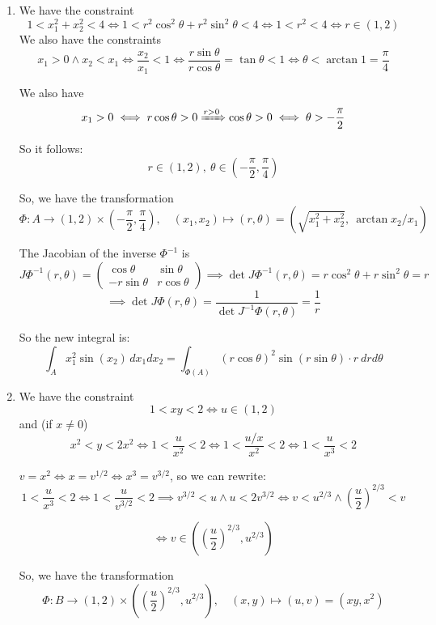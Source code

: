 \documentclass[12pt]{article}
\begin{document}
\begin{enumerate}
    \item We have the constraint 
    $$
        1 < x_1^2 + x_2^2 < 4 \iff 1 < r^2 \cos^2 \theta + r^2 \sin^2 \theta < 4 \iff 1 < r^2 < 4 \iff r \in (1, 2)
    $$
    We also have the constraints 
    $$
        x_1 > 0 \land x_2 < x_1 \iff \frac{x_2}{x_1} < 1 \iff \frac{r \sin \theta}{r \cos \theta} = \tan \theta < 1 \iff \theta < \arctan 1 = \frac{\pi}{4}
    $$ 

    We also have 
    $$
        x_1 > 0 \iff r \cos \theta > 0 \xRightarrow{r > 0} \cos \theta > 0 \iff \theta > -\frac{\pi}{2}
    $$

    So it follows:
    $$
        r \in (1, 2),\ \theta \in \left(-\frac{\pi}{2}, \frac{\pi}{4}\right)
    $$

    So, we have the transformation
    $$
        \Phi: A \rightarrow (1, 2) \times \left(-\frac{\pi}{2}, \frac{\pi}{4}\right), \quad (x_1, x_2) \mapsto (r, \theta) = (\sqrt{x_1^2 + x_2^2},\ \arctan{x_2/x_1})
    $$

    The Jacobian of the inverse $\Phi^{-1}$ is
    $$
        J \Phi^{-1}(r, \theta) = \begin{pmatrix}
            \cos \theta & \sin \theta \\
            -r\sin \theta & r \cos \theta
        \end{pmatrix} \implies \det J\Phi^{-1}(r, \theta) = r \cos^2 \theta + r \sin^2 \theta = r
    $$
    $$
        \implies \det J\Phi(r, \theta) = \frac{1}{\det J^{-1}\Phi(r, \theta)} = \frac{1}{r}
    $$

    So the new integral is:
    $$
        \int_{A} x_1^2 \sin(x_2) \, dx_1 dx_2 = \int_{\Phi(A)} (r \cos \theta)^2 \sin(r \sin \theta) \cdot r\ dr d\theta
    $$

    \item We have the constraint 
    $$
        1 < xy < 2 \iff u \in (1, 2)
    $$
    and (if $x \neq 0$)
    $$
        x^2 < y < 2x^2 \iff 1 < \frac{u}{x^2} < 2 \iff 1 < \frac{u/x}{x^2} < 2 \iff 1 < \frac{u}{x^3} < 2
    $$

    $v = x^2 \iff x = v^{1/2} \iff x^3 = v^{3/2}$, so we can rewrite:
    $$
        1 < \frac{u}{x^3} < 2 \iff 1 < \frac{u}{v^{3/2}} < 2 \implies v^{3/2} < u \land u < 2v^{3/2} \iff v < u^{2/3} \land \left(\frac{u}{2}\right)^{2/3} < v
    $$

    $$
        \iff v \in \left(\left(\frac{u}{2}\right)^{2/3}, u^{2/3}\right)
    $$

    So, we have the transformation
    $$
        \Phi: B \rightarrow (1, 2) \times \left(\left(\frac{u}{2}\right)^{2/3}, u^{2/3}\right), \quad (x, y) \mapsto (u, v) = (xy, x^2)
    $$


\end{enumerate}
\end{document}
